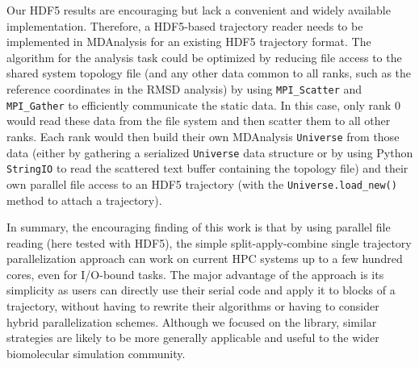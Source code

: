 Our HDF5 results are encouraging but lack a convenient and widely available implementation.
Therefore, a HDF5-based trajectory reader needs to be implemented in MDAnalysis for an existing HDF5 trajectory format.
The algorithm for the analysis task could be optimized by reducing file access to the shared system topology file (and any other data common to all ranks, such as the reference coordinates in the RMSD analysis) by using \texttt{MPI\_Scatter} and \texttt{MPI\_Gather} to efficiently communicate the static data.
In this case, only rank 0 would read these data from the file system and then scatter them to all other ranks.
Each rank would then build their own MDAnalysis \texttt{Universe} from those data (either by gathering a serialized \texttt{Universe} data structure or by using Python \texttt{StringIO} to read the scattered text buffer containing the topology file) and their own parallel file access to an HDF5 trajectory (with the \texttt{Universe.load\_new()} method to attach a trajectory).

In summary, the encouraging finding of this work is that by using parallel file reading (here tested with HDF5), the simple split-apply-combine single trajectory parallelization approach can work on current HPC systems up to a few hundred cores, even for I/O-bound tasks.
The major advantage of the approach is its simplicity as users can directly use their serial code and apply it to blocks of a trajectory, without having to rewrite their algorithms or having to consider hybrid parallelization schemes. 
Although we focused on the  library, similar strategies are likely to be more generally applicable and useful to the wider biomolecular simulation community.




